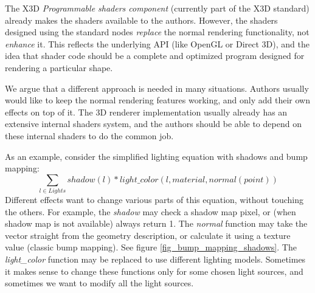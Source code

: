 \documentclass{egpubl}
\begin{document}
The X3D \textit{Programmable shaders component} \cite{x3d:shaders} (currently part of the X3D standard)
already makes
the shaders available to the authors. However, the shaders designed using
the standard nodes
\textit{replace} the normal rendering functionality, not \textit{enhance} it.
This reflects the underlying API (like OpenGL or Direct 3D),
and the idea that shader code should be a complete and optimized program
designed for rendering a particular shape.

We argue that a different approach is needed in many situations.
Authors usually would like to keep the normal rendering features working,
and only add their own effects on top of it. The 3D renderer
implementation usually already has an extensive internal shaders system,
and the authors should be able to depend on these internal shaders
to do the common job.

As an example, consider the simplified lighting equation with shadows
and bump mapping:
$$ \sum_{l\in Lights} shadow(l) * light\_color(l, material, normal(point)) $$
Different effects want to change various parts of this equation,
without touching the others.
For example, the \textit{shadow} may check a shadow map pixel,
or (when shadow map is not available) always return 1.
The \textit{normal} function may take the vector straight from
the geometry description, or calculate it using a texture value (classic bump mapping).
See figure \ref{fig_bump_mapping_shadows}.
The \textit{light\_color} function may be replaced to use different
lighting models.
Sometimes it makes sense
to change these functions only for some chosen light sources, and sometimes
we want to modify all the light sources.
\end{document}
